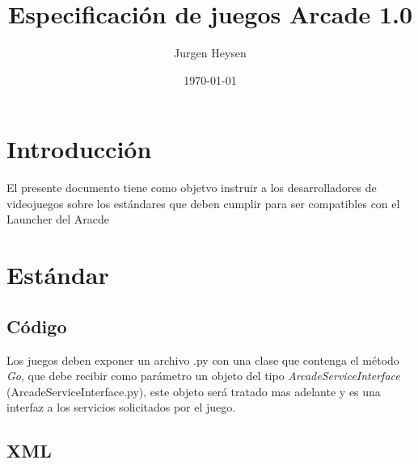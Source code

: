 \documentclass[language=spanish]{article}
\begin{document}
\title{Especificación de juegos Arcade 1.0}
\author{Jurgen Heysen}
\date{\today}
\maketitle
\newpage

\tableofcontents
\newpage

\section{Introducción}

El presente documento tiene como objetvo instruir a los desarrolladores de videojuegos sobre los estándares que deben cumplir para ser compatibles con el Launcher del Aracde

\section{Estándar}

\subsection{Código}

Los juegos deben exponer un archivo .py con una clase que contenga el método {\em Go}, que debe recibir como parámetro un objeto del tipo {\em ArcadeServiceInterface} (ArcadeServiceInterface.py), este objeto será tratado mas adelante y es una interfaz a los servicios solicitados por el juego.

\subsection{XML}
\end{document}
